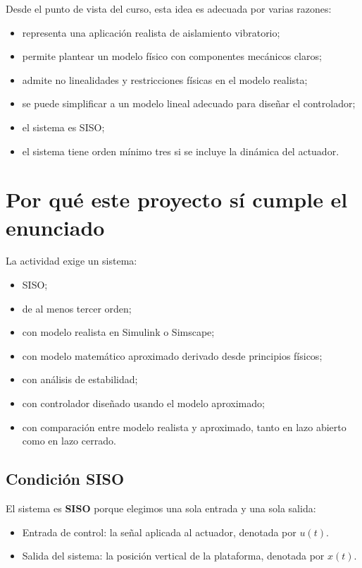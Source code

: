 \documentclass[11pt]{article}
\begin{document}
Desde el punto de vista del curso, esta idea es adecuada por varias razones:

\begin{itemize}[leftmargin=1.2cm]
\item representa una aplicaci\'on realista de aislamiento vibratorio;
\item permite plantear un modelo f\'isico con componentes mec\'anicos claros;
\item admite no linealidades y restricciones f\'isicas en el modelo realista;
\item se puede simplificar a un modelo lineal adecuado para dise\~nar el controlador;
\item el sistema es SISO;
\item el sistema tiene orden m\'inimo tres si se incluye la din\'amica del actuador.
\end{itemize}

\section{Por qu\'e este proyecto s\'i cumple el enunciado}

La actividad exige un sistema:

\begin{itemize}[leftmargin=1.2cm]
\item SISO;
\item de al menos tercer orden;
\item con modelo realista en Simulink o Simscape;
\item con modelo matem\'atico aproximado derivado desde principios f\'isicos;
\item con an\'alisis de estabilidad;
\item con controlador dise\~nado usando el modelo aproximado;
\item con comparaci\'on entre modelo realista y aproximado, tanto en lazo abierto como en lazo cerrado.
\end{itemize}

\subsection{Condici\'on SISO}

El sistema es \textbf{SISO} porque elegimos una sola entrada y una sola salida:

\begin{itemize}[leftmargin=1.2cm]
\item Entrada de control: la se\~nal aplicada al actuador, denotada por $u(t)$.
\item Salida del sistema: la posici\'on vertical de la plataforma, denotada por $x(t)$.
\end{itemize}
\end{document}
